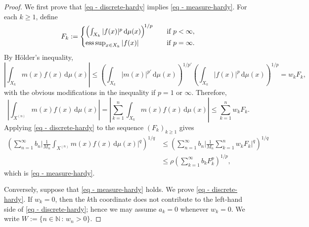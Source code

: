 \documentclass[oneside,10pt]{article}          %
\numberwithin{equation}{section}
\begin{document}
\begin{proof}
We first prove that \eqref{eq - discrete-hardy} implies \eqref{eq - measure-hardy}. For each $k\geq 1$, define
\[
F_k:= 
\begin{cases}
    \left( \int_{X_k} |f(x)|^{p}\,\mathrm{d}\mu(x) \right)^{\!\smash{1/p}} \quad&\text{if }p<\infty,\\
    \operatorname*{ess\,sup}_{x \in X_k} |f(x)|\quad&\text{if }p=\infty.
\end{cases}
\]
By Hölder's inequality,
\[
\left| \int_{X_k}m(x)f(x)\,\mathrm{d}\mu(x) \right| \leq \left( \int_{X_k}|m(x)|^{p'}\,\mathrm{d}\mu(x) \right)^{\!\!1/p'} \!\left( \int_{X_k}|f(x)|^p\,\mathrm{d}\mu(x) \right)^{\!\!1/p} \!= w_k F_k,
\]
with the obvious modifications in the inequality if $p=1$ or $\infty$. Therefore,
\[
\left| \int_{X^{(n)}}m(x)f(x)\,\mathrm{d}\mu(x) \right| = \left| \sum_{k=1}^{n} \int_{X_k}m(x)f(x)\,\mathrm{d}\mu(x) \right| \leq \sum_{k=1}^{n}w_k F_k .
\]
Applying \eqref{eq - discrete-hardy} to the sequence $(F_k)_{k\geq 1}$ gives
\begin{align*}
    \left(\sum_{n=1}^{\infty} b_n \bigg| \frac{1}{M_n} \int_{X^{(n)}}m(x)f(x)\,\mathrm{d}\mu(x) \bigg|^q\right)^{\!\!1/q}\!\!
    &\leq \left(\sum_{n=1}^{\infty} b_n \bigg| \frac{1}{M_n} \sum_{k=1}^{n}w_k F_k \bigg|^q\right)^{\!\!1/q}\\
    &\leq \rho \!\left( \sum_{k=1}^{\infty}b_k F_k^p \right)^{\!\!1/p}\!, %
\end{align*}
which is \eqref{eq - measure-hardy}.

Conversely, suppose that \eqref{eq - measure-hardy} holds. We prove \eqref{eq - discrete-hardy}. If $w_k=0$, then the $k$th coordinate does not contribute to the left-hand side of \eqref{eq - discrete-hardy}; hence we may assume $a_k=0$ whenever $w_k=0$. We write $W := \{ n \in \mathbb{N} \, : \, w_n > 0 \}$. 



\end{proof}
\end{document}
